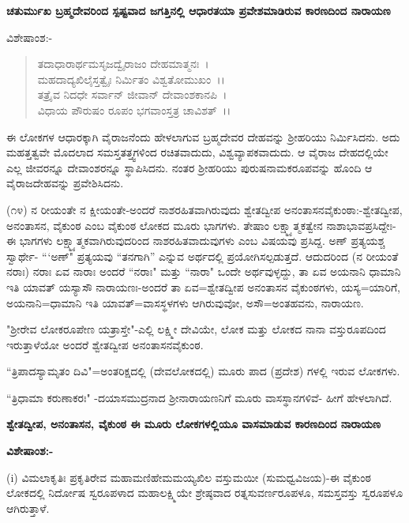 \begin{center}
\textbf{ಚತುರ್ಮುಖ ಬ್ರಹ್ಮದೇವರಿಂದ ಸ್ಪಷ್ಟವಾದ ಜಗತ್ತಿನಲ್ಲಿ ಆಧಾರತಯಾ ಪ್ರವೇಶಮಾಡಿರುವ ಕಾರಣದಿಂದ ನಾರಾಯಣ}
\end{center}

\noindent
ವಿಶೇಷಾಂಶ:-

\begin{verse}
ತದಾಧಾರಾರ್ಥಮಸೃಜದ್ವೈರಾಜಂ ದೇಹಮಾತ್ಮನಃ~।\\ ಮಹದಾದ್ಯಖಿಲೈಸ್ತತ್ವೈಃ ನಿರ್ಮಿತಂ ವಿಶ್ವತೋಮುಖಂ~।।\\ ತತ್ರೈವ ನಿದಧೇ ಸರ್ವಾನ್ ಜೀವಾನ್ ದೇವಾಂಶಕಾನಪಿ~।\\ ವಿಧಾಯ ಪೌರುಷಂ ರೂಪಂ ಭಗವಾಂಸ್ತತ್ರ ಚಾವಿಶತ್~।।
\end{verse}


\noindent
ಈ ಲೋಕಗಳ ಆಧಾರಕ್ಕಾಗಿ ವೈರಾಜನೆಂದು ಹೇಳಲಾಗುವ ಬ್ರಹ್ಮದೇವರ ದೇಹವನ್ನು ಶ‍್ರೀಹರಿಯು ನಿರ್ಮಿಸಿದನು. ಅದು ಮಹತ್ತತ್ವವೇ ಮೊದಲಾದ ಸಮಸ್ತತತ್ತ್ವಗಳಿಂದ ರಚಿತವಾದುದು, ವಿಶ್ವವ್ಯಾಪಕವಾದುದು. ಆ ವೈರಾಜ ದೇಹದಲ್ಲಿಯೇ ಎಲ್ಲ ಜೀವರನ್ನೂ ದೇವಾಂಶರನ್ನೂ ಸ್ಥಾಪಿಸಿದನು. ನಂತರ ಶ‍್ರೀಹರಿಯು ಪುರುಷನಾಮಕರೂಪವನ್ನು ಹೊಂದಿ ಆ ವೈರಾಜದೇಹವನ್ನು ಪ್ರವೇಶಿಸಿದನು.

(೧೪) ನ ರೀಯಂತೇ ನ ಕ್ಷೀಯಂತೇ-ಅಂದರೆ ನಾಶರಹಿತವಾಗಿರುವುದು ಶ್ವೇತದ್ವೀಪ ಅನಂತಾಸನವೈಕುಂಠಾ:-ಶ್ವೇತದ್ವೀಪ, ಅನಂತಾಸನ, ವೈಕುಂಠ ಎಂಬ ವೈಕುಂಠ ಲೋಕದ ಮೂರು ಭಾಗಗಳು. ತೇಷಾಂ ಲಕ್ಷ್ಮ್ಯಾತ್ಮಕತ್ವೇನ ನಾಶಾಭಾವಪ್ರಸಿದ್ದೇಃ- ಈ ಭಾಗಗಳು ಲಕ್ಷ್ಮ್ಯಾತ್ಮಕವಾಗಿರುವುದರಿಂದ ನಾಶರಹಿತವಾದುವುಗಳು ಎಂಬ ವಿಷಯವು ಪ್ರಸಿದ್ದ. ಅಣ್ ಪ್ರತ್ಯಯಶ್ಚ ಸ್ವಾರ್ಥೇ- ```ಅಣ್" ಪ್ರತ್ಯಯವು “ತನಗಾಗಿ'' ಎನ್ನುವ ಅರ್ಥದಲ್ಲಿ ಪ್ರಯೋಗಿಸಲ್ಪಡುತ್ತದೆ. ಆದುದರಿಂದ (ನ ರೀಯಂತೆ ನರಾಃ) ನರಾಃ ಏವ ನಾರಾಃ ಅಂದರೆ ``ನರಾಃ" ಮತ್ತು ``ನಾರಾ" ಒಂದೇ ಅರ್ಥವುಳ್ಳದ್ದು, ತಾ ಏವ ಅಯನಾನಿ ಧಾಮಾನಿ ಇತಿ ಯಾವತ್‌ ಯಸ್ಯಾಸೌ ನಾರಾಯಣಃ-ಅಂದರೆ ತಾ ಏವ=ಶ್ವೇತದ್ವೀಪ ಅನಂತಾಸನ ವೈಕುಂಠಗಳು, ಯಸ್ಯ=ಯಾರಿಗೆ, ಅಯನಾನಿ=ಧಾಮಾನಿ ಇತಿ ಯಾವತ್=ವಾಸಸ್ಥಳಗಳು ಆಗಿರುವುವೋ, ಅಸೌ=ಅಂತಹವನು, ನಾರಾಯಣ.

"ಶ‍್ರೀರೇವ ಲೋಕರೂಪೇಣ ಯತ್ರಾಸ್ತೇ"-ಎಲ್ಲಿ ಲಕ್ಷ್ಮೀ ದೇವಿಯೇ, ಲೋಕ ಮತ್ತು ಲೋಕದ ನಾನಾ ವಸ್ತುರೂಪದಿಂದ ಇರುತ್ತಾಳೆಯೋ ಅಂದರೆ ಶ್ವೇತದ್ವೀಪ ಅನಂತಾಸನವೈಕುಂಠ.

``ತ್ರಿಪಾದಸ್ಯಾಮೃತಂ ದಿವಿ"=ಅಂತರಿಕ್ಷದಲ್ಲಿ (ದೇವಲೋಕದಲ್ಲಿ) ಮೂರು ಪಾದ (ಪ್ರದೇಶ) ಗಳಲ್ಲಿ ಇರುವ ಲೋಕಗಳು.

``ತ್ರಿಧಾಮಾ ಕರುಣಾಕರಃ" -ದಯಾಸಮುದ್ರನಾದ ಶ‍್ರೀನಾರಾಯಣನಿಗೆ ಮೂರು ವಾಸಸ್ಥಾನಗಳಿವೆ- ಹೀಗೆ ಹೇಳಲಾಗಿದೆ.

\textbf{ಶ್ವೇತದ್ವೀಪ, ಅನಂತಾಸನ, ವೈಕುಂಠ ಈ ಮೂರು ಲೋಕಗಳಲ್ಲಿಯೂ ವಾಸಮಾಡುವ ಕಾರಣದಿಂದ ನಾರಾಯಣ}

\noindent
\textbf{ವಿಶೇಷಾಂಶ:-}

(i) ವಿಮಲಾಕೃತಿಃ ಪ್ರಕೃತಿರೇವ ಮಹಾಮಣಿಹೇಮಮಯ್ಯಖಿಲ ವಸ್ತುಮಯೀ (ಸುಮಧ್ವವಿಜಯ)-ಈ ವೈಕುಂಠ ಲೋಕದಲ್ಲಿ ನಿರ್ದೋಷ ಸ್ವರೂಪಳಾದ ಮಹಾಲಕ್ಷ್ಮಿಯೇ ಶ್ರೇಷ್ಠವಾದ ರತ್ನಸುವರ್ಣರೂಪಳೂ, ಸಮಸ್ತವಸ್ತು ಸ್ವರೂಪಳೂ ಆಗಿರುತ್ತಾಳೆ.

